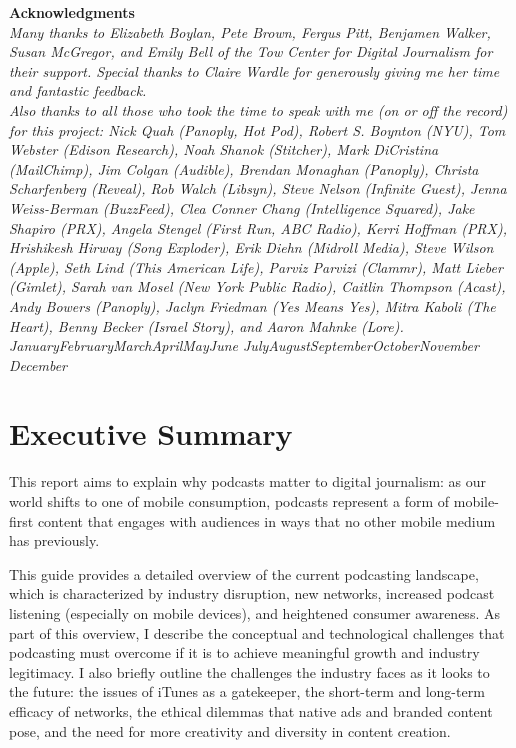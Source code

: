 \documentclass[notoc, symmetric, nobib, nols]{towcenter-guideto-book}
\newcommand{\monthyear}{%
  \ifcase\month\or January\or February\or March\or April\or May\or June\or
  July\or August\or September\or October\or November\or
  December\fi\space\number\year
}
\newcommand{\blankpage}{\newpage\hbox{}\thispagestyle{empty}\newpage}
\begin{document}
\blankpage
\blankpage


\null
\begin{fullwidth}
\noindent\textsf{\textbf{Acknowledgments}} \\[0.3cm]
\noindent\textit{Many thanks to Elizabeth Boylan, Pete Brown, Fergus Pitt, Benjamen Walker, Susan McGregor, and Emily Bell of the Tow Center for Digital Journalism for their support. Special thanks to Claire Wardle for generously giving me her time and fantastic feedback.
}\\[0.1cm]\noindent\textit{
Also thanks to all those who took the time to speak with me (on or off the record) for this project: Nick Quah (Panoply, Hot Pod), Robert S. Boynton (NYU), Tom Webster (Edison Research), Noah Shanok (Stitcher), Mark DiCristina (MailChimp), Jim Colgan (Audible), Brendan Monaghan (Panoply), Christa Scharfenberg (\textit{Reveal}), Rob Walch (Libsyn), Steve Nelson (Infinite Guest), Jenna Weiss-Berman (BuzzFeed), Clea Conner Chang (\textit{Intelligence Squared}), Jake Shapiro (PRX), Angela Stengel (First Run, ABC Radio), Kerri Hoffman (PRX), Hrishikesh Hirway (\textit{Song Exploder}), Erik Diehn (Midroll Media), Steve Wilson (Apple), Seth Lind (\textit{This American Life}), Parviz Parvizi (Clammr), Matt Lieber (Gimlet), Sarah van Mosel (New York Public Radio), Caitlin Thompson (Acast), Andy Bowers (Panoply), Jaclyn Friedman (Yes Means Yes), Mitra Kaboli (The Heart), Benny Becker (Israel Story), and Aaron Mahnke (\textit{Lore}).  
}\\[0.1cm]
\noindent\textit{\monthyear}
\end{fullwidth}
\tableofcontents


\cleardoublepage


\mainmatter


\chapter{Executive Summary}

This report aims to explain why podcasts matter to digital journalism: as our world shifts to one of mobile consumption, podcasts represent a form of mobile-first content that engages with audiences in ways that no other mobile medium has previously.

This guide provides a detailed overview of the current podcasting landscape, which is characterized by industry disruption, new networks, increased podcast listening (especially on mobile devices), and heightened consumer awareness. As part of this overview, I describe the conceptual and technological challenges that podcasting must overcome if it is to achieve meaningful growth and industry legitimacy. I also briefly outline the challenges the industry faces as it looks to the future: the issues of iTunes as a gatekeeper, the short-term and long-term efficacy of networks, the ethical dilemmas that native ads and branded content pose, and the need for more creativity and diversity in content creation.
\end{document}
